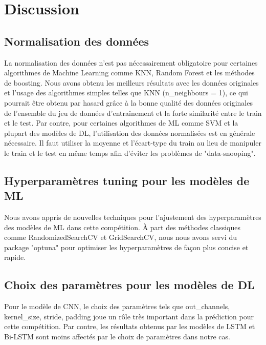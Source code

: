 \documentclass{article}
\begin{document}
\section{Discussion}
\subsection{Normalisation des données}
La normalisation des données n'est pas nécessairement obligatoire pour certaines
 algorithmes de Machine Learning comme KNN, Random Forest et les méthodes de 
 boosting. Nous avons obtenu les meilleurs résultats avec les données originales
  et l'usage des algorithmes simples telles que KNN (n\_neighbours = 1), ce qui 
  pourrait être obtenu par hasard grâce à la bonne qualité des données 
  originales de l'ensemble du jeu de données d'entraînement et la forte 
  similarité entre le train et le test. Par contre, pour certaines algorithmes 
  de ML comme SVM et la plupart des modèles de DL, l'utilisation des données 
  normalisées est en générale nécessaire. Il faut utiliser la moyenne et 
  l'écart-type du train au lieu de manipuler le train et le test en même temps 
  afin d'éviter les problèmes de "data-snooping". 

\subsection{Hyperparamètres tuning pour les modèles de ML}
Nous avons appris de nouvelles techniques pour l'ajustement des hyperparamètres 
des modèles de ML dans cette compétition. À part des méthodes classiques comme 
RandomizedSearchCV et GridSearchCV, nous nous avons servi du package "optuna" 
pour optimiser les hyperparamètres de façon plus concise et rapide. 

\subsection{Choix des paramètres pour les modèles de DL}
Pour le modèle de CNN, le choix des paramètres tels que 
out\_channels, kernel\_size, stride, padding
joue un rôle très important dans la prédiction pour cette compétition. Par 
contre, les résultats obtenus par les modèles de LSTM et Bi-LSTM sont moins 
affectés par le choix de paramètres dans notre cas. 
\end{document}
